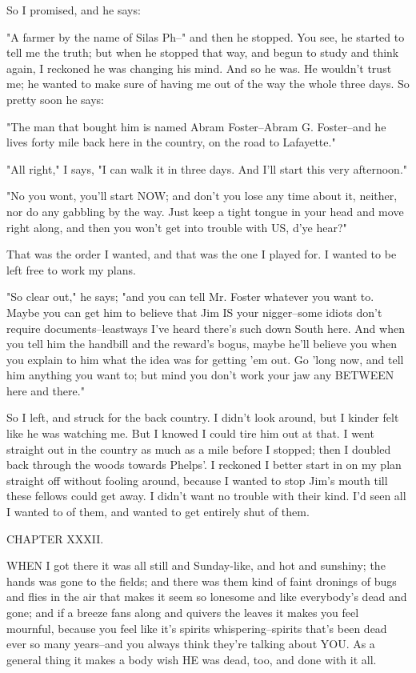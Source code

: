 So I promised, and he says:

"A farmer by the name of Silas Ph--" and then he stopped.  You see, he
started to tell me the truth; but when he stopped that way, and begun to
study and think again, I reckoned he was changing his mind.  And so he
was. He wouldn't trust me; he wanted to make sure of having me out of the
way the whole three days.  So pretty soon he says:

"The man that bought him is named Abram Foster--Abram G. Foster--and he
lives forty mile back here in the country, on the road to Lafayette."

"All right," I says, "I can walk it in three days.  And I'll start this
very afternoon."

"No you wont, you'll start NOW; and don't you lose any time about it,
neither, nor do any gabbling by the way.  Just keep a tight tongue in
your head and move right along, and then you won't get into trouble with
US, d'ye hear?"

That was the order I wanted, and that was the one I played for.  I wanted
to be left free to work my plans.

"So clear out," he says; "and you can tell Mr. Foster whatever you want
to. Maybe you can get him to believe that Jim IS your nigger--some idiots
don't require documents--leastways I've heard there's such down South
here.  And when you tell him the handbill and the reward's bogus, maybe
he'll believe you when you explain to him what the idea was for getting
'em out.  Go 'long now, and tell him anything you want to; but mind you
don't work your jaw any BETWEEN here and there."

So I left, and struck for the back country.  I didn't look around, but I
kinder felt like he was watching me.  But I knowed I could tire him out
at that.  I went straight out in the country as much as a mile before I
stopped; then I doubled back through the woods towards Phelps'.  I
reckoned I better start in on my plan straight off without fooling
around, because I wanted to stop Jim's mouth till these fellows could get
away.  I didn't want no trouble with their kind.  I'd seen all I wanted
to of them, and wanted to get entirely shut of them.




CHAPTER XXXII.

WHEN I got there it was all still and Sunday-like, and hot and sunshiny;
the hands was gone to the fields; and there was them kind of faint
dronings of bugs and flies in the air that makes it seem so lonesome and
like everybody's dead and gone; and if a breeze fans along and quivers
the leaves it makes you feel mournful, because you feel like it's spirits
whispering--spirits that's been dead ever so many years--and you always
think they're talking about YOU.  As a general thing it makes a body wish
HE was dead, too, and done with it all.

